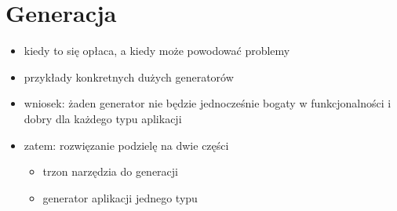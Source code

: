 \chapter{Generacja} \label{chap:generation}

\begin{itemize}
 \item kiedy to się opłaca, a kiedy może powodować problemy
 \item przykłady konkretnych dużych generatorów
 \item wniosek: żaden generator nie będzie jednocześnie bogaty w funkcjonalności i dobry dla każdego typu aplikacji
 \item zatem: rozwięzanie podzielę na dwie części
  \begin{itemize}
   \item trzon narzędzia do generacji
   \item generator aplikacji jednego typu
  \end{itemize}
\end{itemize}
